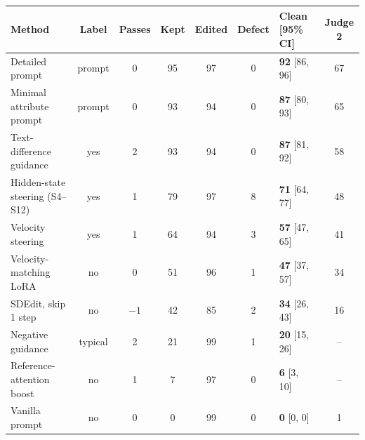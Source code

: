 \begin{tabular}{@{}lccccclc@{}}
\toprule
Method & Label & Passes & Kept & Edited & Defect & Clean [95\% CI] & Judge 2 \\
\midrule
Detailed prompt & prompt & 0 & 95 & 97 & 0 & \textbf{92} [86, 96] & 67 \\
Minimal attribute prompt & prompt & 0 & 93 & 94 & 0 & \textbf{87} [80, 93] & 65 \\
Text-difference guidance & yes & 2 & 93 & 94 & 0 & \textbf{87} [81, 92] & 58 \\
Hidden-state steering (S4--S12) & yes & 1 & 79 & 97 & 8 & \textbf{71} [64, 77] & 48 \\
Velocity steering & yes & 1 & 64 & 94 & 3 & \textbf{57} [47, 65] & 41 \\
\midrule
Velocity-matching LoRA & no & 0 & 51 & 96 & 1 & \textbf{47} [37, 57] & 34 \\
SDEdit, skip 1 step & no & $-1$ & 42 & 85 & 2 & \textbf{34} [26, 43] & 16 \\
Negative guidance & typical & 2 & 21 & 99 & 1 & \textbf{20} [15, 26] & -- \\
Reference-attention boost & no & 1 & 7 & 97 & 0 & \textbf{6} [3, 10] & -- \\
Vanilla prompt & no & 0 & 0 & 99 & 0 & \textbf{0} [0, 0] & 1 \\
\bottomrule
\end{tabular}